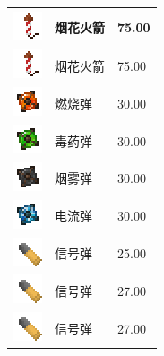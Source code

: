 \documentclass[UTF8]{ctexart}
\begin{document}
\begin{longtable}[]{|p{1cm}|p{8cm}|p{1.5cm}|}
	\hline
	\includegraphics{.workspace/icons/minecraft/minecraft__fireworks__0.png} & 烟花火箭 &75.00\\
	\hline
	\includegraphics{.workspace/icons/minecraft/minecraft__fireworks__0.png} & 烟花火箭 &75.00\\
	\hline
	\includegraphics{.workspace/icons/ebwizardry/ebwizardry__firebomb__0.png} & 燃烧弹 &30.00\\
	\hline
	\includegraphics{.workspace/icons/ebwizardry/ebwizardry__poison_bomb__0.png} & 毒药弹 &30.00\\
	\hline
	\includegraphics{.workspace/icons/ebwizardry/ebwizardry__smoke_bomb__0.png} & 烟雾弹 &30.00\\
	\hline
	\includegraphics{.workspace/icons/ebwizardry/ebwizardry__spark_bomb__0.png} & 电流弹 &30.00\\
	\hline
	\includegraphics{.workspace/icons/immersiveengineering/immersiveengineering__bullet__2.png} & 信号弹 &25.00\\
	\hline
	\includegraphics{.workspace/icons/immersiveengineering/immersiveengineering__bullet__2.png} & 信号弹 &27.00\\
	\hline
	\includegraphics{.workspace/icons/immersiveengineering/immersiveengineering__bullet__2.png} & 信号弹 &27.00\\

\end{longtable}
\end{document}
